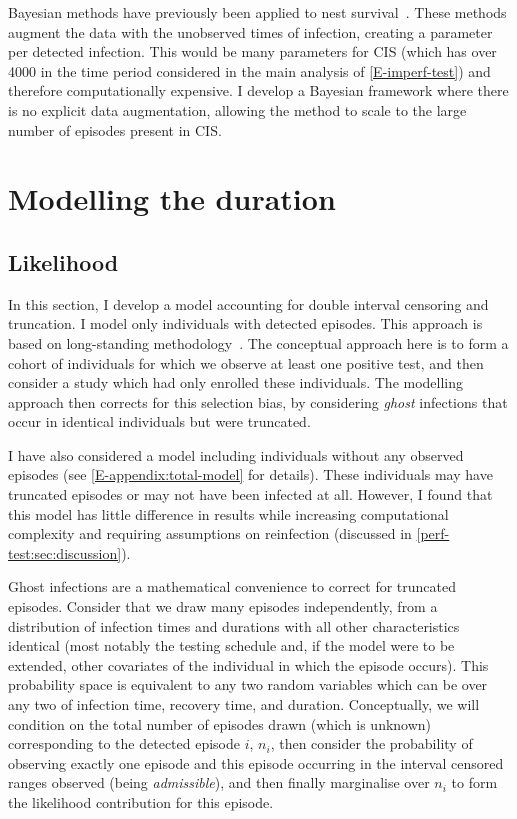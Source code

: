 \documentclass[thesis.tex]{subfiles}
\begin{document}
Bayesian methods have previously been applied to nest survival~\autocites{heBayesiana}{heBayesian}{caoModeling}.
These methods augment the data with the unobserved times of infection, creating a parameter per detected infection.
This would be many parameters for CIS (which has over 4000 in the time period considered in the main analysis of \cref{E-imperf-test}) and therefore computationally expensive.
I develop a Bayesian framework where there is no explicit data augmentation, allowing the method to scale to the large number of episodes present in CIS.


\section{Modelling the duration}\label{perf-test:sec:model}

\subsection{Likelihood}\label{perf-test:sec:likelihood}

In this section, I develop a model accounting for double interval censoring and truncation.
I model only individuals with detected episodes.
This approach is based on long-standing methodology~\autocites{heiseyModelling}{dempsterMaximum}{turnbullEmpirical}.
The conceptual approach here is to form a cohort of individuals for which we observe at least one positive test, and then consider a study which had only enrolled these individuals.
The modelling approach then corrects for this selection bias, by considering \emph{ghost} infections that occur in identical individuals but were truncated.

I have also considered a model including individuals without any observed episodes (see \cref{E-appendix:total-model} for details).
These individuals may have truncated episodes or may not have been infected at all.
However, I found that this model has little difference in results while increasing computational complexity and requiring assumptions on reinfection (discussed in \cref{perf-test:sec:discussion}).

Ghost infections are a mathematical convenience to correct for truncated episodes.
Consider that we draw many episodes independently, from a distribution of infection times and durations with all other characteristics identical (most notably the testing schedule and, if the model were to be extended, other covariates of the individual in which the episode occurs).
This probability space is equivalent to any two random variables which can be over any two of infection time, recovery time, and duration.
Conceptually, we will condition on the total number of episodes drawn (which is unknown) corresponding to the detected episode $i$, $n_i$, then consider the probability of observing exactly one episode and this episode occurring in the interval censored ranges observed (being \emph{admissible}), and then finally marginalise over $n_i$ to form the likelihood contribution for this episode.
\end{document}
